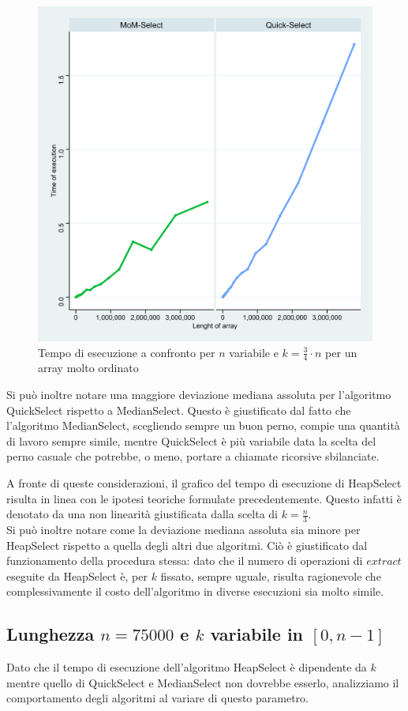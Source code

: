 \documentclass{article}
\begin{document}
	\begin{figure}[h!]		
		\centering
  		\includegraphics[width=0.7\columnwidth]{images/MoM_Quick_graph_ordered.png}
  		\caption{Tempo di esecuzione a confronto per $n$ variabile e $k=\frac{3}{4}\cdot n$ per un array molto ordinato}
  		\label{fig:graph2}
	\end{figure}
	
	Si può inoltre notare una maggiore deviazione mediana assoluta per l'algoritmo QuickSelect rispetto a MedianSelect. Questo è giustificato dal fatto che l'algoritmo MedianSelect, scegliendo sempre un buon perno, compie una quantità di lavoro sempre simile, mentre QuickSelect è più variabile data la scelta del perno casuale che potrebbe, o meno, portare a chiamate ricorsive sbilanciate.
	
	\newpage
	A fronte di queste considerazioni, il grafico del tempo di esecuzione di HeapSelect risulta in linea con le ipotesi teoriche formulate precedentemente. Questo infatti è denotato da una non linearità giustificata dalla scelta di $k=\frac{n}{3}$. 
	\\
	Si può inoltre notare come la deviazione mediana assoluta sia minore per HeapSelect rispetto a quella degli altri due algoritmi. Ciò è giustificato dal funzionamento della procedura stessa: dato che il numero di operazioni di $extract$ eseguite da HeapSelect è, per $k$ fissato, sempre uguale, risulta ragionevole che complessivamente il costo dell'algoritmo in diverse esecuzioni sia molto simile. 
		
	\newpage
	
	\subsection{Lunghezza $n=75000$ e $k$ variabile in $[0,n-1]$}
	Dato che il tempo di esecuzione dell'algoritmo HeapSelect è dipendente da $k$ mentre quello di QuickSelect e MedianSelect non dovrebbe esserlo, analizziamo il comportamento degli algoritmi al variare di questo parametro.
	
\end{document}
